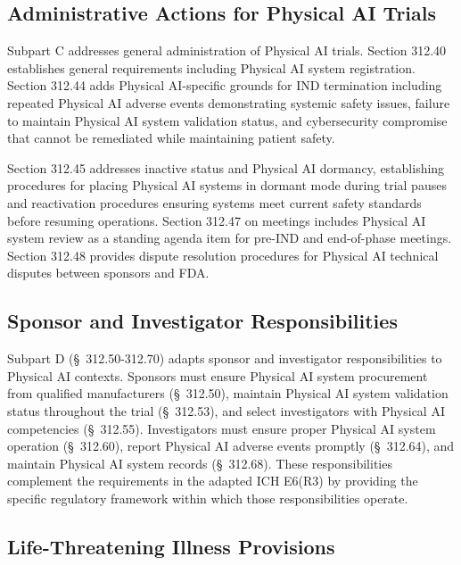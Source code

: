 \subsection{Administrative Actions for Physical AI Trials}
\label{subsec:cfr312-admin}

Subpart C addresses general administration of Physical AI trials. Section 312.40
establishes general requirements including Physical AI system registration.
Section 312.44 adds Physical AI-specific grounds for IND termination including
repeated Physical AI adverse events demonstrating systemic safety issues,
failure to maintain Physical AI system validation status, and cybersecurity
compromise that cannot be remediated while maintaining patient safety.

Section 312.45 addresses inactive status and Physical AI dormancy, establishing
procedures for placing Physical AI systems in dormant mode during trial pauses
and reactivation procedures ensuring systems meet current safety standards
before resuming operations. Section 312.47 on meetings includes Physical AI
system review as a standing agenda item for pre-IND and end-of-phase meetings.
Section 312.48 provides dispute resolution procedures for Physical AI technical
disputes between sponsors and FDA.

\subsection{Sponsor and Investigator Responsibilities}
\label{subsec:cfr312-responsibilities}

Subpart D (\S~312.50-312.70) adapts sponsor and investigator responsibilities
to Physical AI contexts. Sponsors must ensure Physical AI system procurement
from qualified manufacturers (\S~312.50), maintain Physical AI system
validation status throughout the trial (\S~312.53), and select investigators
with Physical AI competencies (\S~312.55). Investigators must ensure proper
Physical AI system operation (\S~312.60), report Physical AI adverse events
promptly (\S~312.64), and maintain Physical AI system records (\S~312.68).
These responsibilities complement the requirements in the adapted ICH E6(R3)
\cite{ich-adapt} by providing the specific regulatory framework within which
those responsibilities operate.

\subsection{Life-Threatening Illness Provisions}
\label{subsec:cfr312-life-threatening}

